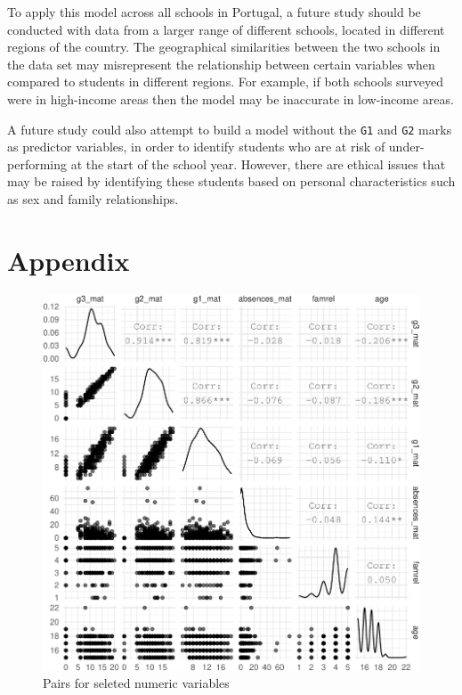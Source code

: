 \documentclass[a4paper,9pt,twocolumn,twoside,]{pinp}
\begin{document}
To apply this model across all schools in Portugal, a future study
should be conducted with data from a larger range of different schools,
located in different regions of the country. The geographical
similarities between the two schools in the data set may misrepresent
the relationship between certain variables when compared to students in
different regions. For example, if both schools surveyed were in
high-income areas then the model may be inaccurate in low-income areas.

A future study could also attempt to build a model without the
\texttt{G1} and \texttt{G2} marks as predictor variables, in order to
identify students who are at risk of under-performing at the start of
the school year. However, there are ethical issues that may be raised by
identifying these students based on personal characteristics such as sex
and family relationships.

\pagebreak

\nocite{*}




\hypertarget{appendix}{%
\section{Appendix}\label{appendix}}

\begin{figure}[htbp]

{\centering \includegraphics[width=1\linewidth]{Executive-summary_files/figure-latex/pairs-1} 

}

\caption{Pairs for seleted numeric variables}\label{fig:pairs}
\end{figure}
\end{document}
